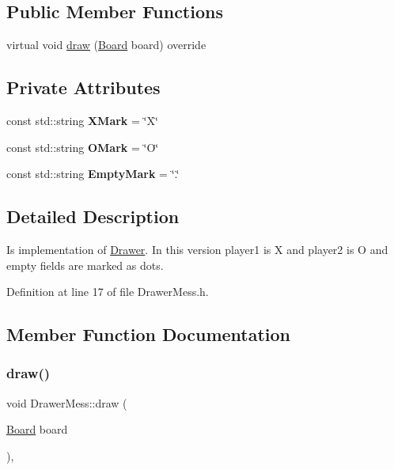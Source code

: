 \subsection*{Public Member Functions}
\begin{DoxyCompactItemize}
\item 
virtual void \hyperlink{classDrawerMess_a6d682acdf4ad01f370f9985cacd606a9}{draw} (\hyperlink{classBoard}{Board} board) override
\end{DoxyCompactItemize}
\subsection*{Private Attributes}
\begin{DoxyCompactItemize}
\item 
\mbox{\label{classDrawerMess_ab431d116153398b05905cffe8505544e}} 
const std\+::string {\bfseries X\+Mark} = \char`\"{}X\char`\"{}
\item 
\mbox{\label{classDrawerMess_aeafb5b339bba9f4ee02bf85f0126f05d}} 
const std\+::string {\bfseries O\+Mark} = \char`\"{}O\char`\"{}
\item 
\mbox{\label{classDrawerMess_a315afa5f3ef89dcdec37bb876ead17ee}} 
const std\+::string {\bfseries Empty\+Mark} = \char`\"{}.\char`\"{}
\end{DoxyCompactItemize}


\subsection{Detailed Description}
Is implementation of \hyperlink{classDrawer}{Drawer}. In this version player1 is X and player2 is O and empty fields are marked as dots. 

Definition at line 17 of file Drawer\+Mess.\+h.



\subsection{Member Function Documentation}
\mbox{\label{classDrawerMess_a6d682acdf4ad01f370f9985cacd606a9}} 
\subsubsection{\texorpdfstring{draw()}{draw()}}
{\footnotesize\ttfamily void Drawer\+Mess\+::draw (\begin{DoxyParamCaption}\item[{\hyperlink{classBoard}{Board}}]{board }\end{DoxyParamCaption})\hspace{0.3cm}{\ttfamily [override]}, {\ttfamily [virtual]}}

